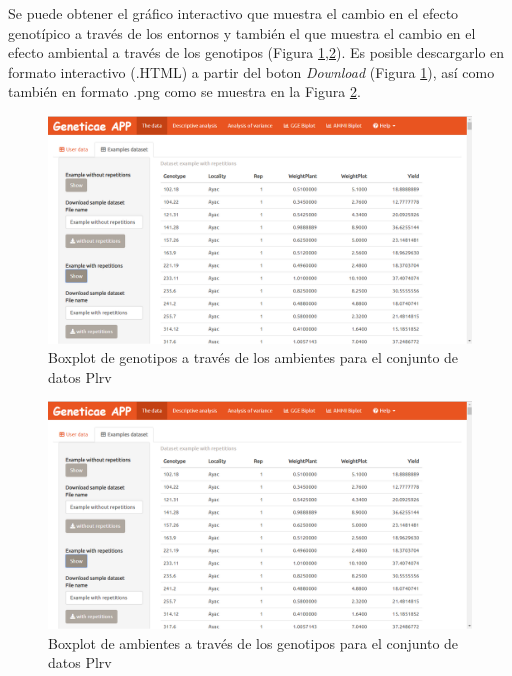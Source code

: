 Se puede obtener el gráfico interactivo que muestra el cambio en el efecto genotípico a través de los entornos y también el que muestra el cambio en el efecto ambiental a través de los genotipos (Figura \ref{fig:fig49},\ref{fig:fig410}). Es posible descargarlo en formato interactivo (.HTML) a partir del boton \emph{Download} (Figura \ref{fig:fig49}), así como también en formato .png como se muestra en la Figura \ref{fig:fig410}.


\begin{figure}[H]
	\begin{center}
		\includegraphics[width=17cm]{./Graficos/Exampledatasets_withrep.png}
	\end{center}
	\caption{Boxplot de genotipos a través de los ambientes para el conjunto de datos Plrv}
	\label{fig:fig49}
\end{figure}


\begin{figure}[H]
	\begin{center}
		\includegraphics[width=17cm]{./Graficos/Exampledatasets_withrep.png}
	\end{center}
	\caption{Boxplot de ambientes a través de los genotipos para el conjunto de datos Plrv}
	\label{fig:fig410}
\end{figure}


